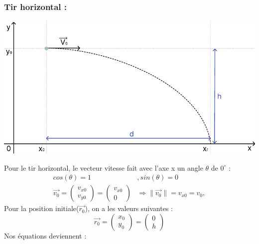 \documentclass[12pt,a4paper]{article}
\begin{document}
    \subsubsection{Tir horizontal :}
    \begin{center}
        \includegraphics[scale=0.8]{exp1_graph.pdf} \\
    \end{center}
    Pour le tir horizontal, le vecteur vitesse fait avec l'axe x un angle $\theta$ de $0^\circ$ :
    \begin{align*}
        cos(\theta)=1&, sin(\theta)=0 \\
        \vec{v_0}=
        \begin{pmatrix}
            v_{x0} \\
            v_{y0}
        \end{pmatrix}
        =
        \begin{pmatrix}
            v_{x0} \\
            0
        \end{pmatrix}
        &\Rightarrow \|\vec{v_0}\|=v_{x0}=v_0,
    \end{align*}
    Pour la position initiale($\vec{r_0}$), on a les valeurs suivantes :
    \begin{equation*}
        \vec{r_0}=
        \begin{pmatrix}
            x_0 \\
            y_0
        \end{pmatrix}
        =
        \begin{pmatrix}
            0 \\
            h
        \end{pmatrix}
    \end{equation*}
    Nos équations deviennent :
\end{document}
